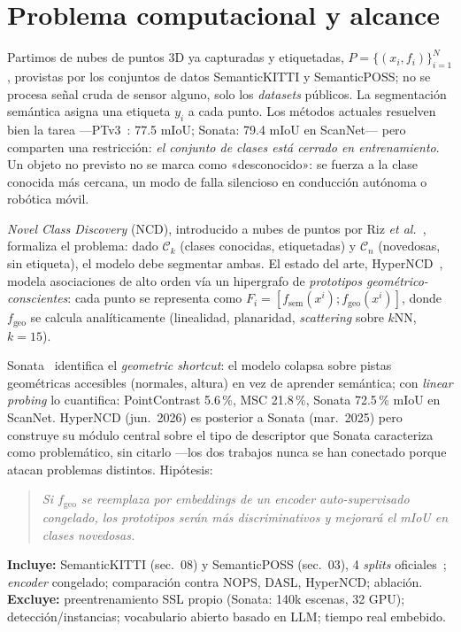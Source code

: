 \documentclass[9.5pt,twocolumn,a4paper]{article}
\begin{document}
\section{Problema computacional y alcance}
Partimos de nubes de puntos 3D ya capturadas y etiquetadas,
$P=\{(x_i,f_i)\}_{i=1}^{N}$, provistas por los conjuntos de datos
SemanticKITTI y SemanticPOSS; no se procesa señal cruda de sensor alguno,
solo los \emph{datasets} públicos. La
segmentación semántica asigna una etiqueta $y_i$ a cada punto. Los métodos
actuales resuelven bien la tarea ---PTv3~\cite{ptv3}: 77.5 mIoU; Sonata:
79.4 mIoU en ScanNet--- pero comparten una restricción: \emph{el conjunto de
clases está cerrado en entrenamiento}. Un objeto no previsto no se marca como
«desconocido»: se fuerza a la clase conocida más cercana, un modo de falla
silencioso en conducción autónoma o robótica móvil.

\emph{Novel Class Discovery} (NCD), introducido a nubes de puntos por Riz
\emph{et al.}~\cite{nops}, formaliza el problema: dado $\mathcal{C}_k$
(clases conocidas, etiquetadas) y $\mathcal{C}_n$ (novedosas, sin etiqueta),
el modelo debe segmentar ambas. El estado del arte, HyperNCD~\cite{hyperncd},
modela asociaciones de alto orden vía un hipergrafo de \emph{prototipos
geométrico-conscientes}: cada punto se representa como
$F_i=[f_{\mathrm{sem}}(x^i);f_{\mathrm{geo}}(x^i)]$, donde $f_{\mathrm{geo}}$
se calcula analíticamente (linealidad, planaridad, \emph{scattering} sobre
$k$NN, $k{=}15$).

Sonata~\cite{sonata} identifica el \emph{geometric shortcut}: el modelo
colapsa sobre pistas geométricas accesibles (normales, altura) en vez de
aprender semántica; con \emph{linear probing} lo cuantifica: PointContrast
5.6\,\%, MSC 21.8\,\%, Sonata 72.5\,\% mIoU en ScanNet. HyperNCD (jun.\ 2026)
es posterior a Sonata (mar.\ 2025) pero construye su módulo central sobre el
tipo de descriptor que Sonata caracteriza como problemático, sin citarlo
---los dos trabajos nunca se han conectado porque atacan problemas distintos.
Hipótesis:

\begin{quotation}\noindent\footnotesize\itshape
Si $f_{\mathrm{geo}}$ se reemplaza por embeddings de un \emph{encoder}
auto-supervisado congelado, los prototipos serán más discriminativos y
mejorará el mIoU en clases novedosas.
\end{quotation}

\textbf{Incluye:} SemanticKITTI (sec.\ 08) y SemanticPOSS (sec.\ 03), 4
\emph{splits} oficiales~\cite{nops,dasl}; \emph{encoder} congelado;
comparación contra NOPS, DASL, HyperNCD; ablación.
\textbf{Excluye:} preentrenamiento SSL propio (Sonata: 140k escenas, 32 GPU);
detección/instancias; vocabulario abierto basado en LLM; tiempo real embebido.
\end{document}
